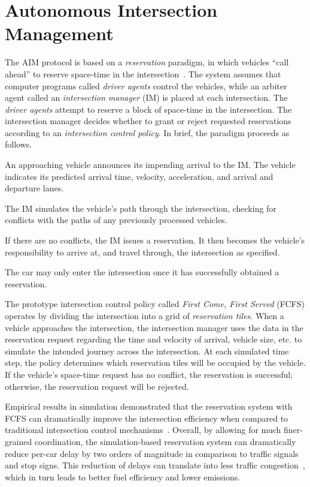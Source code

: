 \section{Autonomous Intersection Management}
\label{sec:aim}

The AIM protocol is based on a \emph{reservation} paradigm, in which
vehicles ``call ahead'' to reserve space-time in the
intersection~\cite{bib:Dresner08Multiagent}. The system assumes that
computer programs called \emph{driver agents} control the vehicles,
while an arbiter agent called an \emph{intersection manager} (IM) is
placed at each intersection.  The \emph{driver agents} attempt to reserve a
block of space-time in the intersection.  The intersection manager
decides whether to grant or reject requested reservations according to
an \emph{intersection control policy}.  In brief, the paradigm
proceeds as follows.
\begin{small_ind_s_itemize}
\item An approaching vehicle announces its impending arrival to the
IM.  The vehicle indicates its predicted arrival time, velocity,
acceleration, and arrival and departure lanes.
\item The IM simulates the vehicle's path through
the intersection, checking for conflicts with the paths of any
previously processed vehicles.
\item If there are no conflicts, the IM issues a
reservation. It then becomes the vehicle's responsibility to arrive at, and
travel through, the intersection as specified.
\item The car may only enter the intersection once it has successfully
obtained a reservation.
\end{small_ind_s_itemize}
The prototype intersection control policy called \emph{First Come,
First Served} (FCFS) operates by dividing the intersection into a grid
of \emph{reservation tiles}. When a vehicle approaches the
intersection, the intersection manager uses the data in the
reservation request regarding the time and velocity of arrival,
vehicle size, etc. to simulate the intended journey across the
intersection.  At each simulated time step, the policy determines
which reservation tiles will be occupied by the vehicle.  If the
vehicle's space-time request has no conflict, the reservation is
successful; otherwise, the reservation request will be rejected.

Empirical results in simulation demonstrated that the 
reservation system with FCFS can dramatically improve the intersection
efficiency when compared to traditional intersection control
mechanisms~\cite{bib:Dresner08Multiagent}.  Overall, by
allowing for much finer-grained coordination, the simulation-based
reservation system can dramatically reduce per-car delay by two orders
of magnitude in comparison to traffic signals and stop signs.  This
reduction of delays can translate into less traffic
congestion~\cite{bib:Au10Motion,bib:Quinlan10Bringing}, which in turn
leads to better fuel efficiency and lower emissions.

